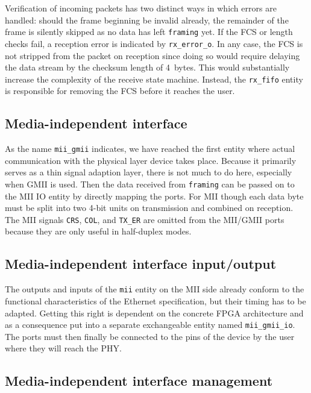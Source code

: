 \documentclass[a4paper, 11pt, oneside]{Thesis}  %
\begin{document}
Verification of incoming packets has two distinct ways in which errors are handled: should the frame beginning be invalid already, the remainder of the frame is silently skipped as no data has left \texttt{framing} yet. If the FCS or length checks fail, a reception error is indicated by \texttt{rx\_error\_o}. In any case, the FCS is not stripped from the packet on reception since doing so would require delaying the data stream by the checksum length of 4~bytes. This would substantially increase the complexity of the receive state machine. Instead, the \texttt{rx\_fifo} entity is responsible for removing the FCS before it reaches the user.

\subsection{Media-independent interface}

As the name \texttt{mii\_gmii} indicates, we have reached the first entity where actual communication with the physical layer device takes place. Because it primarily serves as a thin signal adaption layer, there is not much to do here, especially when GMII is used. Then the data received from \texttt{framing} can be passed on to the MII IO entity by directly mapping the ports. For MII though each data byte must be split into two 4-bit units on transmission and combined on reception. The MII signals \texttt{CRS}, \texttt{COL}, and \texttt{TX\_ER} are omitted from the MII/GMII ports because they are only useful in half-duplex modes.

\subsection{Media-independent interface input/output}

The outputs and inputs of the \texttt{mii} entity on the MII side already conform to the functional characteristics of the Ethernet specification, but their timing has to be adapted. Getting this right is dependent on the concrete FPGA architecture and as a consequence put into a separate exchangeable entity named \texttt{mii\_gmii\_io}. The ports must then finally be connected to the pins of the device by the user where they will reach the PHY.

\subsection{Media-independent interface management}
\end{document}
